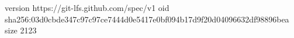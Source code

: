 version https://git-lfs.github.com/spec/v1
oid sha256:03d0cbde347c97c97ce7444d0e5417e0bf094b17d9f20d04096632df98896bea
size 2123
